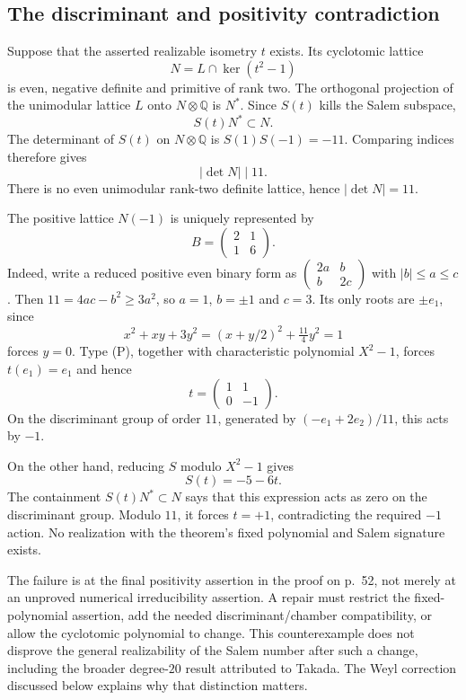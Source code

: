 \documentclass[10pt]{article}
\begin{document}
\subsection*{The discriminant and positivity contradiction}
Suppose that the asserted realizable isometry \(t\) exists. Its cyclotomic lattice \[N=L\cap\ker(t^2-1)\] is even, negative definite and primitive of rank two. The orthogonal projection of the unimodular lattice \(L\) onto \(N\otimes\mathbb Q\) is \(N^*\). Since \(S(t)\) kills the Salem subspace, \[S(t)N^*\subset N.\] The determinant of \(S(t)\) on \(N\otimes\mathbb Q\) is \(S(1)S(-1)=-11\). Comparing indices therefore gives \[|\det N|\mid11.\] There is no even unimodular rank-two definite lattice, hence \(|\det N|=11\).\par
The positive lattice \(N(-1)\) is uniquely represented by \[B=\begin{pmatrix}2&1\\1&6\end{pmatrix}.\] Indeed, write a reduced positive even binary form as \(\left(\begin{smallmatrix}2a&b\\b&2c\end{smallmatrix}\right)\) with \(|b|\le a\le c\). Then \(11=4ac-b^2\ge3a^2\), so \(a=1\), \(b=\pm1\) and \(c=3\). Its only roots are \(\pm e_1\), since \[x^2+xy+3y^2=(x+y/2)^2+\tfrac{11}{4}y^2=1\] forces \(y=0\). Type (P), together with characteristic polynomial \(X^2-1\), forces \(t(e_1)=e_1\) and hence \[t=\begin{pmatrix}1&1\\0&-1\end{pmatrix}.\] On the discriminant group of order \(11\), generated by \((-e_1+2e_2)/11\), this acts by \(-1\).\par
On the other hand, reducing \(S\) modulo \(X^2-1\) gives \[S(t)=-5-6t.\] The containment \(S(t)N^*\subset N\) says that this expression acts as zero on the discriminant group. Modulo \(11\), it forces \(t=+1\), contradicting the required \(-1\) action. No realization with the theorem’s fixed polynomial and Salem signature exists.\par
The failure is at the final positivity assertion in the proof on p. 52, not merely at an unproved numerical irreducibility assertion. A repair must restrict the fixed-polynomial assertion, add the needed discriminant/chamber compatibility, or allow the cyclotomic polynomial to change. This counterexample does not disprove the general realizability of the Salem number after such a change, including the broader degree-\(20\) result attributed to Takada. The Weyl correction discussed below explains why that distinction matters.\par
\end{document}
